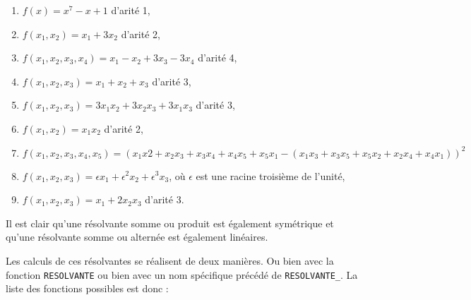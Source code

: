 \begin{enumerate}
\item $f(x)=x^7-x+1$ d'arit\'e 1,
\item $f(x_1,x_2) = x_1+3x_2$ d'arit\'e 2,
\item $f(x_1,x_2,x_3,x_4) = x_1 -x_2 + 3x_3-3x_4$ d'arit\'e 4,
\item $f(x_1,x_2,x_3) = x_1+x_2+x_3$ d'arit\'e 3,
\item $f(x_1,x_2,x_3) = 3x_1x_2 + 3x_2x_3 +3x_1x_3$ d'arit\'e 3,
\item $f(x_1,x_2) =x_1x_2$ d'arit\'e 2,
\item $f(x_1,x_2,x_3,x_4,x_5)=(x_1x2+x_2x_3+x_3x_4+x_4x_5+x_5x_1 -
        (x_1x_3+x_3x_5+x_5x_2+x_2x_4+x_4x_1))^2$
\item $f(x_1,x_2,x_3) = \epsilon x_1 + \epsilon^2 x_2 + \epsilon^3
x_3$, o\`u $\epsilon$ est une racine troisi\`eme de l'unit\'e,
\item $f(x_1,x_2,x_3) = x_1 +2x_2x_3$ d'arit\'e 3.
\end{enumerate}
Il est clair qu'une r\'esolvante somme ou produit est \'egalement
sym\'etrique et qu'une r\'esolvante somme ou altern\'ee est
\'egalement lin\'eaires.

Les calculs de ces r\'esolvantes se r\'ealisent de deux mani\`eres. Ou bien 
avec la fonction {\tt RESOLVANTE} ou bien avec un nom sp\'ecifique 
pr\'ec\'ed\'e de {\tt RESOLVANTE\_}. La liste des fonctions possibles est 
donc :


